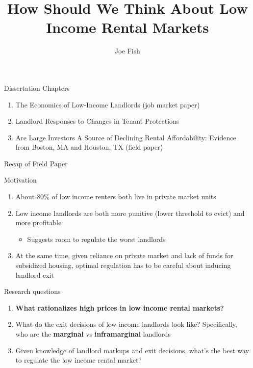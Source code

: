 \documentclass[10pt, xcolor=dvipsnames]{beamer}
\date{}
\title[Joe Fish Prospectus]{How Should We Think About Low Income Rental Markets} %
\author[Joe Fish]{Joe Fish}
\begin{document}
\begin{frame}
\titlepage %
\end{frame}

\begin{frame}{Dissertation Chapters}
    \begin{enumerate}
        \item The Economics of Low-Income Landlords (job market paper)
        \item Landlord Responses to Changes in Tenant Protections
        \item Are Large Investors A Source of Declining Rental Affordability: Evidence from Boston, MA and Houston, TX (field paper)
    \end{enumerate}
    
\end{frame}

\begin{frame}{Recap of Field Paper}
    
    
\end{frame}

\begin{frame}{Motivation}
    \begin{enumerate}
        \item About 80\% of low income renters both live in private market units \parencite{jchs_2024, nhpd2024profiles}
        \pause
        \item Low income landlords are both more punitive (lower threshold to evict) and more profitable \parencite{Desmond_2019, Eisfeldt_2015,Damen_2025}
        \begin{itemize}
            \item Suggests room to regulate the worst landlords
        \end{itemize}
        \pause
        \item At the same time, given reliance on private market and lack of funds for subsidized housing, optimal regulation has to be careful about inducing landlord exit
    \end{enumerate}

\end{frame}

\begin{frame}{Research questions}

\begin{enumerate}
    \item \textbf{What rationalizes high prices in low income rental markets?}
    \pause
    \item What do the exit decisions of low income landlords look like? Specifically, who are the \textbf{marginal} vs \textbf{inframarginal} landlords
    \pause
    \item Given knowledge of landlord markups and exit decisions, what's the best way to regulate the low income rental market?
\end{enumerate}

\end{frame}
\end{document}
